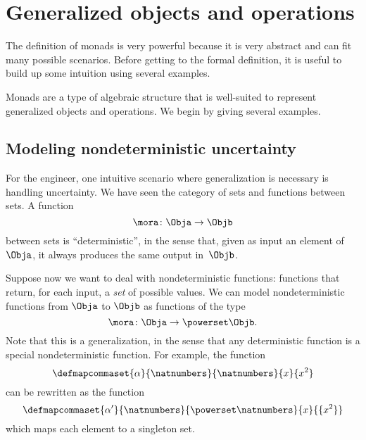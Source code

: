 
\section{Generalized objects and operations}

The definition of monads is very powerful because it is very abstract and can fit many possible scenarios.
Before getting to the formal definition, it is useful to build up some intuition using several examples.

Monads are a type of algebraic structure that is well-suited to represent generalized objects and operations.
We begin by giving several examples.

\subsection{Modeling nondeterministic uncertainty}

For the engineer, one intuitive scenario where generalization is necessary is handling uncertainty.
We have seen the category  \Set of sets and functions between sets.
A function
\begin{equation}
    \label{eq:monad-simple}
    \mora\colon\Obja\to\Objb
\end{equation}
between sets is ``deterministic'', in the sense that, given as input an element of~$\Obja$, it always produces the same output in~$\Objb$.

Suppose now we want to deal with nondeterministic functions: functions that return, for each input, a \emph{set} of possible values.
We can model nondeterministic functions from $\Obja$ to $\Objb$ as functions of the type
\begin{equation}
    \label{eq:monad-generalized}
    \mora\colon\Obja\to\powerset\Objb.
\end{equation}
%
Note that this is a generalization, in the sense that any deterministic function is a special nondeterministic function.
For example, the function
%
\begin{equation}
    \label{eq:monad-alpha-example1}
    \defmapcommaset{
        \alpha
    }{
        \natnumbers
    }{
        \natnumbers
    }{
        x
    }{
        x^2
    }
\end{equation}
%
can be rewritten as the function
%
\begin{equation}
    \label{eq:monad-alpha-example2}
    \defmapcommaset{
        \alpha'
    }{
        \natnumbers
    }{
        \powerset\natnumbers
    }{
        x
    }{
        \{x^2\}
    }
\end{equation}
%
which maps each element to a singleton set.

